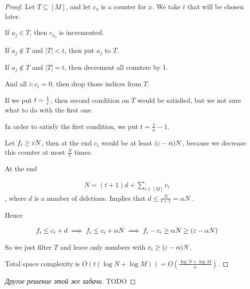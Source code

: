 \begin{proof}
	Let $T \subseteq [M]$,  and let $c_x$ is a counter for  $x$. 
	We take $t$ that will be chosen later.

	If $a_j \in T$, then  $c_{a_j}$ is incremented.

	If $a_j \not \in T$ and  $|T| < t$, then put $a_j$ to  $T$.

	If  $a_j \not \in T$ and  $|T| = t$, then decrement all counters by 1.

 	And all  $i \colon c_i = 0$, then drop those indices from  $T$. 

	If we put $t = \frac{1}{\varepsilon}$, then second condition on $T$ would be satisfied, but we not sure what to do with the first one.
	
	In order to satisfy the first condition, we put $t = \frac{1}{\alpha} - 1$.

	Let $f_i \geq \varepsilon N$, then at the end  $c_i$ would be at least  $(\varepsilon - \alpha) N$, because we decrease this counter at most  $\frac{N}{t}$ times. 

	At the end

	\begin{align*}
		N = (t+ 1) d + \sum_{i \in [M]} c_i
	\end{align*}, where $d$ is a number of deletions.
	Implies that  $d \leq \frac{N}{t + 1} = \alpha N$ .

	Hence

	\begin{align*}
		f_i \leq c_i + d \implies f_i \leq c_i + \alpha N \implies f_i - c_i \geq \alpha N \geq (\varepsilon - \alpha N)
	\end{align*}

	So we just filter $T$ and leave only numbers with  $c_i \geq (\varepsilon - \alpha) N$.

	Total space complexity is $O(t (\log N + \log M)) = O\left( \frac{\log N + \log M}{\alpha}\right)$.
\end{proof}

\begin{proof}[Другое решение этой же задачи]
	TODO
\end{proof}
